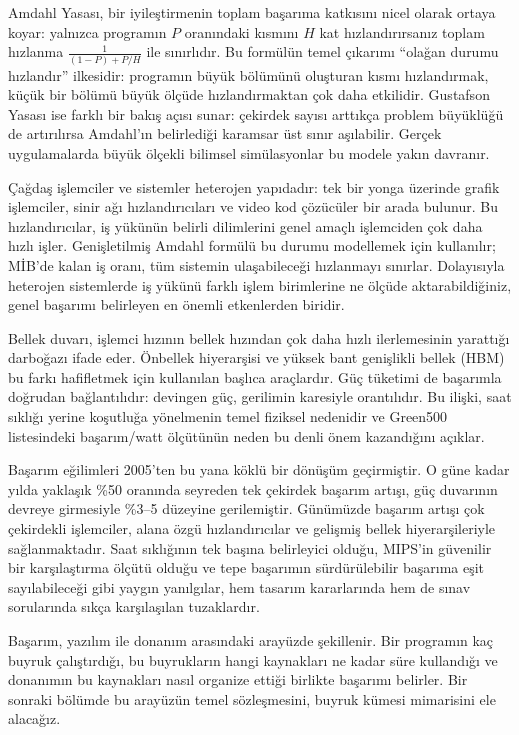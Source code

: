 Amdahl Yasası, bir iyileştirmenin toplam başarıma katkısını nicel olarak ortaya koyar: yalnızca programın $P$ oranındaki kısmını $H$ kat hızlandırırsanız toplam hızlanma $\frac{1}{(1-P)+P/H}$ ile sınırlıdır. Bu formülün temel çıkarımı ``olağan durumu hızlandır'' ilkesidir: programın büyük bölümünü oluşturan kısmı hızlandırmak, küçük bir bölümü büyük ölçüde hızlandırmaktan çok daha etkilidir. Gustafson Yasası ise farklı bir bakış açısı sunar: çekirdek sayısı arttıkça problem büyüklüğü de artırılırsa Amdahl'ın belirlediği karamsar üst sınır aşılabilir. Gerçek uygulamalarda büyük ölçekli bilimsel simülasyonlar bu modele yakın davranır.

Çağdaş işlemciler ve sistemler heterojen yapıdadır: tek bir yonga üzerinde grafik işlemciler, sinir ağı hızlandırıcıları ve video kod çözücüler bir arada bulunur. Bu hızlandırıcılar, iş yükünün belirli dilimlerini genel amaçlı işlemciden çok daha hızlı işler. Genişletilmiş Amdahl formülü bu durumu modellemek için kullanılır; MİB'de kalan iş oranı, tüm sistemin ulaşabileceği hızlanmayı sınırlar. Dolayısıyla heterojen sistemlerde iş yükünü farklı işlem birimlerine ne ölçüde aktarabildiğiniz, genel başarımı belirleyen en önemli etkenlerden biridir.

Bellek duvarı, işlemci hızının bellek hızından çok daha hızlı ilerlemesinin yarattığı darboğazı ifade eder. Önbellek hiyerarşisi ve yüksek bant genişlikli bellek (HBM) bu farkı hafifletmek için kullanılan başlıca araçlardır. Güç tüketimi de başarımla doğrudan bağlantılıdır: devingen güç, gerilimin karesiyle orantılıdır. Bu ilişki, saat sıklığı yerine koşutluğa yönelmenin temel fiziksel nedenidir ve Green500 listesindeki başarım/watt ölçütünün neden bu denli önem kazandığını açıklar.

Başarım eğilimleri 2005'ten bu yana köklü bir dönüşüm geçirmiştir. O güne kadar yılda yaklaşık \%50 oranında seyreden tek çekirdek başarım artışı, güç duvarının devreye girmesiyle \%3--5 düzeyine gerilemiştir. Günümüzde başarım artışı çok çekirdekli işlemciler, alana özgü hızlandırıcılar ve gelişmiş bellek hiyerarşileriyle sağlanmaktadır. Saat sıklığının tek başına belirleyici olduğu, MIPS'in güvenilir bir karşılaştırma ölçütü olduğu ve tepe başarımın sürdürülebilir başarıma eşit sayılabileceği gibi yaygın yanılgılar, hem tasarım kararlarında hem de sınav sorularında sıkça karşılaşılan tuzaklardır.

Başarım, yazılım ile donanım arasındaki arayüzde şekillenir. Bir programın kaç buyruk çalıştırdığı, bu buyrukların hangi kaynakları ne kadar süre kullandığı ve donanımın bu kaynakları nasıl organize ettiği birlikte başarımı belirler. Bir sonraki bölümde bu arayüzün temel sözleşmesini, buyruk kümesi mimarisini ele alacağız.


